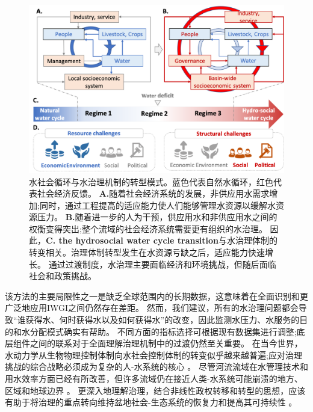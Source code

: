\begin{figure}[htbp!]
	\centering
	\includegraphics[width=\textwidth]{img/ch4/transition.png}
	\caption{
		水社会循环与水治理机制的转型模式。蓝色代表自然水循环，红色代表社会经济反馈。
        \textbf{A.}随着社会经济系统的发展，非供应用水需求增加;同时，通过工程提高的适应能力使人们能够管理水资源以缓解水资源压力。
        \textbf{B.}随着进一步的人为干预，供应用水和非供应用水之间的权衡变得突出;整个流域的社会经济系统需要更有组织的水治理。
        因此，\textbf{C. the hydrosocial water cycle transition}与水治理体制的转变相关。治理体制转型发生在水资源亏缺之后，适应能力快速增长。
        通过过渡制度，水治理主要面临经济和环境挑战，但随后面临社会和政策挑战。
	}
	\label{fig:summary}
\end{figure}


该方法的主要局限性之一是缺乏全球范围内的长期数据，这意味着在全面识别和更广泛地应用IWGI之间仍然存在差距。
然而，我们建议，所有的水治理问题都会导致“谁获得水、何时获得水以及如何获得水”的改变，因此监测水压力、水服务的目的和水分配模式确实有帮助。
不同方面的指标选择可根据现有数据集进行调整;底层组件之间的联系对于全面理解治理机制中的过渡仍然至关重要。
在当今世界，水动力学从生物物理控制体制向水社会控制体制的转变似乎越来越普遍;应对治理挑战的综合战略必须成为复杂的人-水系统的核心
\cite{cumming2018,cumming2014,jaeger2019}。
尽管河流流域在水管理技术和用水效率方面已经有所改善，但许多流域仍在接近人类-水系统可能崩溃的地方、区域和地球边界
\cite{gleeson2020, wang-erlandsson2022}。
更深入地理解治理，结合非线性政权转移和转型的思想，应该有助于将治理的重点转向维持盆地社会-生态系统的恢复力和提高其可持续性
\cite{falkenmark2019}。
